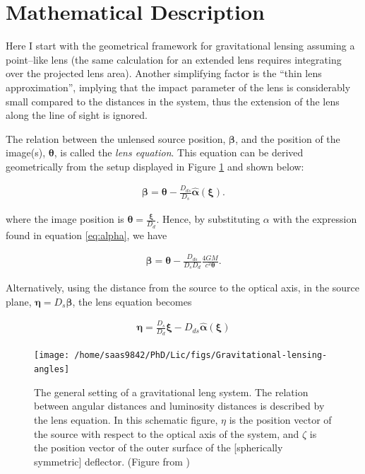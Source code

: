 \documentclass[a4wide,12pt]{book}
\begin{document}
{\section{Mathematical Description}
Here I start with the geometrical framework for gravitational lensing assuming a point--like lens (the same calculation for an extended lens requires integrating over the projected lens area). Another simplifying factor is the ``thin lens approximation'', implying that the impact parameter of the lens is considerably small compared to the distances in the system, thus the extension of the lens along the line of sight is ignored.

The relation between the unlensed source position, $\boldsymbol \beta$, and the position of the image(s), $\boldsymbol \theta$, is called the \emph{lens equation}. This equation can be derived geometrically from the setup displayed in Figure \ref{fig:config} and shown below:

\begin{eqnarray}
\label{eq:lens_eq_angle}
\boldsymbol \beta = \boldsymbol \theta - \frac{D_{ds}}{D_s} \hat{\boldsymbol \alpha}(\boldsymbol \xi).
\end{eqnarray}

 where the image position is $\boldsymbol \theta = \frac{\boldsymbol \xi}{D_{d}}$. Hence, by substituting $\alpha$ with the expression found in equation \ref{eq:alpha}, we have

\begin{eqnarray}
\label{eq:lens_equation}
\boldsymbol \beta = \boldsymbol \theta - \frac{D_{ds}}{D_s D_d} \frac{4GM}{c^2 \boldsymbol \theta}.
\end{eqnarray}

 Alternatively, using the distance from the source to the optical axis, in the source plane,  $\boldsymbol \eta = D_{s} \boldsymbol \beta$, the lens equation becomes

\begin{eqnarray}
\label{eq:lens_eq_distance}
\boldsymbol \eta = \frac{D_s}{D_d}\boldsymbol \xi - D_{ds}\hat{\boldsymbol \alpha}(\boldsymbol \xi)
\end{eqnarray}

\begin{figure}
\label{fig:config}
\centering
\texttt{[image: /home/saas9842/PhD/Lic/figs/Gravitational-lensing-angles]}
\caption{The general setting of a gravitational leng system. The relation between angular distances and luminosity distances is described by the lens equation. In this schematic figure, $\eta$ is the position vector of the source with respect to the optical axis of the system, and $\zeta$ is the position vector of the outer surface of the [spherically symmetric] deflector. (Figure from \citealt[][]{GLbook})}
\end{figure}

}
\end{document}
